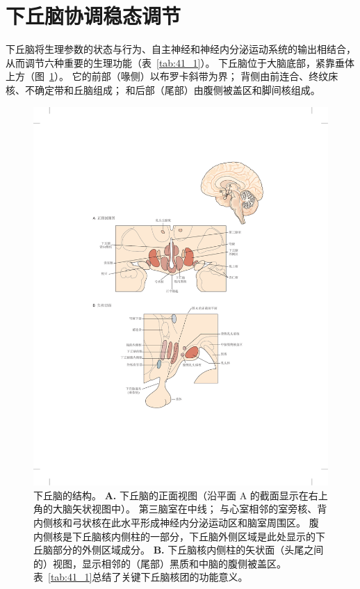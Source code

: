 \section{下丘脑协调稳态调节}

下丘脑将生理参数的状态与行为、自主神经和神经内分泌运动系统的输出相结合，从而调节六种重要的生理功能（表~\ref{tab:41_1}）。
下丘脑位于大脑底部，紧靠垂体上方（图~\ref{fig:41_2}）。
它的前部（喙侧）以布罗卡斜带为界；
背侧由前连合、终纹床核、不确定带和丘脑组成；
和后部（尾部）由腹侧被盖区和脚间核组成。


\begin{figure}[htbp]
	\centering
	\includegraphics[width=0.9\linewidth]{chap41/fig_41_2}
	\caption{下丘脑的结构。
		\textbf{A.} 下丘脑的正面视图（沿平面 A 的截面显示在右上角的大脑矢状视图中）。
		第三脑室在中线；
		与心室相邻的室旁核、背内侧核和弓状核在此水平形成神经内分泌运动区和脑室周围区。
		腹内侧核是下丘脑核内侧柱的一部分，下丘脑外侧区域是此处显示的下丘脑部分的外侧区域成分。 
		\textbf{B.} 下丘脑核内侧柱的矢状面（头尾之间的）视图，显示相邻的（尾部）黑质和中脑的腹侧被盖区。
		表~\ref{tab:41_1}总结了关键下丘脑核团的功能意义。}
	\label{fig:41_2}
\end{figure}



